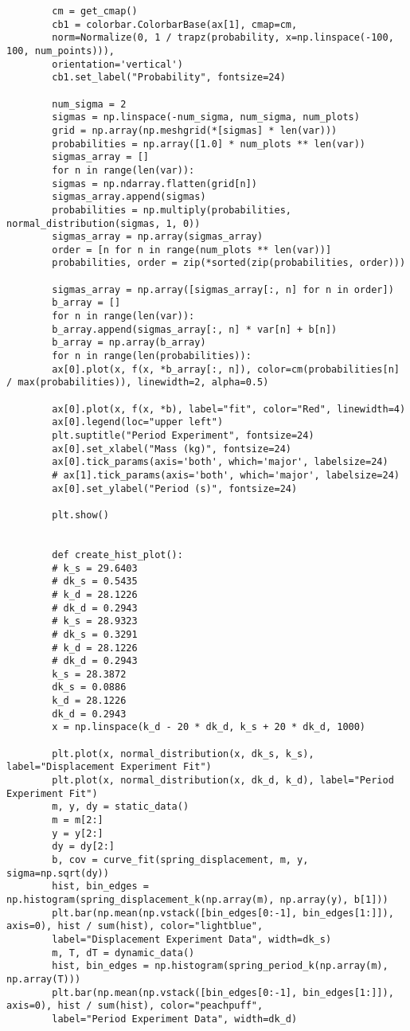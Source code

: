 \documentclass{article}
\begin{document}
\begin{verbatim}
        cm = get_cmap()
        cb1 = colorbar.ColorbarBase(ax[1], cmap=cm,
        norm=Normalize(0, 1 / trapz(probability, x=np.linspace(-100, 100, num_points))),
        orientation='vertical')
        cb1.set_label("Probability", fontsize=24)

        num_sigma = 2
        sigmas = np.linspace(-num_sigma, num_sigma, num_plots)
        grid = np.array(np.meshgrid(*[sigmas] * len(var)))
        probabilities = np.array([1.0] * num_plots ** len(var))
        sigmas_array = []
        for n in range(len(var)):
        sigmas = np.ndarray.flatten(grid[n])
        sigmas_array.append(sigmas)
        probabilities = np.multiply(probabilities, normal_distribution(sigmas, 1, 0))
        sigmas_array = np.array(sigmas_array)
        order = [n for n in range(num_plots ** len(var))]
        probabilities, order = zip(*sorted(zip(probabilities, order)))

        sigmas_array = np.array([sigmas_array[:, n] for n in order])
        b_array = []
        for n in range(len(var)):
        b_array.append(sigmas_array[:, n] * var[n] + b[n])
        b_array = np.array(b_array)
        for n in range(len(probabilities)):
        ax[0].plot(x, f(x, *b_array[:, n]), color=cm(probabilities[n] / max(probabilities)), linewidth=2, alpha=0.5)

        ax[0].plot(x, f(x, *b), label="fit", color="Red", linewidth=4)
        ax[0].legend(loc="upper left")
        plt.suptitle("Period Experiment", fontsize=24)
        ax[0].set_xlabel("Mass (kg)", fontsize=24)
        ax[0].tick_params(axis='both', which='major', labelsize=24)
        # ax[1].tick_params(axis='both', which='major', labelsize=24)
        ax[0].set_ylabel("Period (s)", fontsize=24)

        plt.show()


        def create_hist_plot():
        # k_s = 29.6403
        # dk_s = 0.5435
        # k_d = 28.1226
        # dk_d = 0.2943
        # k_s = 28.9323
        # dk_s = 0.3291
        # k_d = 28.1226
        # dk_d = 0.2943
        k_s = 28.3872
        dk_s = 0.0886
        k_d = 28.1226
        dk_d = 0.2943
        x = np.linspace(k_d - 20 * dk_d, k_s + 20 * dk_d, 1000)

        plt.plot(x, normal_distribution(x, dk_s, k_s), label="Displacement Experiment Fit")
        plt.plot(x, normal_distribution(x, dk_d, k_d), label="Period Experiment Fit")
        m, y, dy = static_data()
        m = m[2:]
        y = y[2:]
        dy = dy[2:]
        b, cov = curve_fit(spring_displacement, m, y, sigma=np.sqrt(dy))
        hist, bin_edges = np.histogram(spring_displacement_k(np.array(m), np.array(y), b[1]))
        plt.bar(np.mean(np.vstack([bin_edges[0:-1], bin_edges[1:]]), axis=0), hist / sum(hist), color="lightblue",
        label="Displacement Experiment Data", width=dk_s)
        m, T, dT = dynamic_data()
        hist, bin_edges = np.histogram(spring_period_k(np.array(m), np.array(T)))
        plt.bar(np.mean(np.vstack([bin_edges[0:-1], bin_edges[1:]]), axis=0), hist / sum(hist), color="peachpuff",
        label="Period Experiment Data", width=dk_d)


\end{verbatim}
\end{document}
